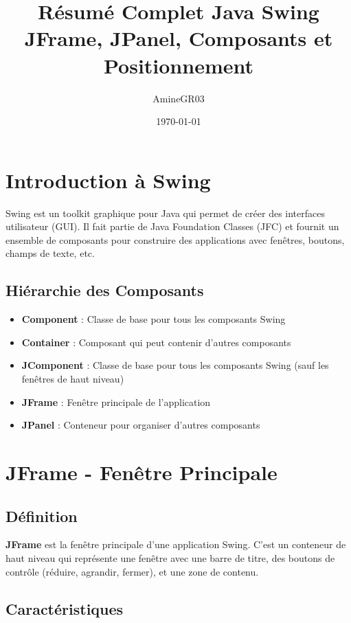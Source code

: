 \documentclass[11pt,a4paper]{article}
\title{Résumé Complet Java Swing\\
\large JFrame, JPanel, Composants et Positionnement}
\author{AmineGR03}
\date{\today}
\begin{document}
\maketitle

\tableofcontents
\newpage

\section{Introduction à Swing}

Swing est un toolkit graphique pour Java qui permet de créer des interfaces utilisateur (GUI). Il fait partie de Java Foundation Classes (JFC) et fournit un ensemble de composants pour construire des applications avec fenêtres, boutons, champs de texte, etc.

\subsection{Hiérarchie des Composants}

\begin{itemize}
    \item \textbf{Component} : Classe de base pour tous les composants Swing
    \item \textbf{Container} : Composant qui peut contenir d'autres composants
    \item \textbf{JComponent} : Classe de base pour tous les composants Swing (sauf les fenêtres de haut niveau)
    \item \textbf{JFrame} : Fenêtre principale de l'application
    \item \textbf{JPanel} : Conteneur pour organiser d'autres composants
\end{itemize}

\newpage

\section{JFrame - Fenêtre Principale}

\subsection{Définition}

\textbf{JFrame} est la fenêtre principale d'une application Swing. C'est un conteneur de haut niveau qui représente une fenêtre avec une barre de titre, des boutons de contrôle (réduire, agrandir, fermer), et une zone de contenu.

\subsection{Caractéristiques}
\end{document}
